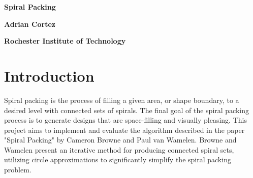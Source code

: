 \documentclass[11pt]{article}
\begin{document}
\begin{center}
    \huge
    \textbf{Spiral Packing}
    
    \vspace{0.1cm}
    \Large
    \textbf{Adrian Cortez}
    
    \vspace{0.1cm}
    \small
    \textbf{Rochester Institute of Technology}
    \vspace{0.3cm}
\end{center}


\section{Introduction}
	Spiral packing is the process of filling a given area, or shape boundary, to a desired level with connected sets of spirals. The final goal of the spiral packing process is to generate designs that are space-filling and visually pleasing. This project aims to implement and evaluate the algorithm described in the paper "Spiral Packing" by Cameron Browne and Paul van Wamelen. Browne and Wamelen present an iterative method for producing connected spiral sets, utilizing circle approximations to significantly simplify the spiral packing problem.\cite{Browne2006834}
\end{document}
